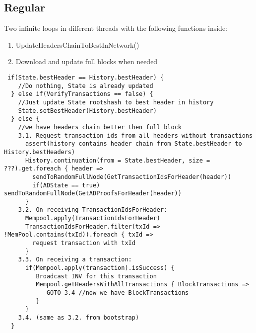 \documentclass[]{report}   %
\begin{document}
\subsection{Regular}
Two infinite loops in different threads with the following functions inside:
\begin{enumerate}
\item UpdateHeadersChainToBestInNetwork()
\item Download and update full blocks when needed
\end{enumerate}
\begin{verbatim}
 if(State.bestHeader == History.bestHeader) {
    //Do nothing, State is already updated
  } else if(VerifyTransactions == false) {
    //Just update State rootshash to best header in history
    State.setBestHeader(History.bestHeader)
  } else {
    //we have headers chain better then full block         
    3.1. Request transaction ids from all headers without transactions
      assert(history contains header chain from State.bestHeader to History.bestHeaders)
      History.continuation(from = State.bestHeader, size = ???).get.foreach { header => 
        sendToRandomFullNode(GetTransactionIdsForHeader(header))
        if(ADState == true) sendToRandomFullNode(GetADProofsForHeader(header))
      }
    3.2. On receiving TransactionIdsForHeader:
      Mempool.apply(TransactionIdsForHeader)
      TransactionIdsForHeader.filter(txId => !MemPool.contains(txId)).foreach { txId => 
        request transaction with txId
      }
    3.3. On receiving a transaction:
      if(Mempool.apply(transaction).isSuccess) {
         Broadcast INV for this transaction
         Mempool.getHeadersWithAllTransactions { BlockTransactions =>
            GOTO 3.4 //now we have BlockTransactions
         }
      }
    3.4. (same as 3.2. from bootstrap)
  }
\end{verbatim}


\end{document}
